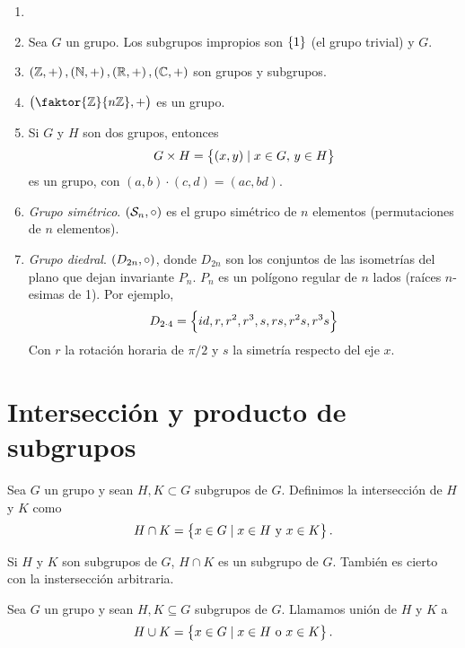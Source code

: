 \begin{example}
    \begin{enumerate}[1.]
        \item[]
        \item Sea $G$ un grupo. Los subgrupos impropios son $\left\{1\right\}$ (el grupo trivial) y $G$.
        \item $\left( \mathbb{Z}, + \right), \left( \mathbb{N}, + \right), \left( \mathbb{R}, + \right), \left( \mathbb{C}, + \right)$ son grupos y subgrupos.
        \item $\lp \faktor{\z}{n\z}, + \rp$ es un grupo.
        \item Si $G$ y $H$ son dos grupos, entonces
            \[
                 G \times H = \left\{(x,y) \mid x \in G, \, y \in H\right\}   
            \]
            es un grupo, con $(a, b) \cdot (c, d) = (ac, bd)$.
        \item \emph{Grupo simétrico}. $\left( \mathcal{S}_n, \circ \right)$ es el grupo simétrico de $n$ elementos (permutaciones de $n$ elementos).
        \item \emph{Grupo diedral}. $\left( D_{2n}, \circ \right)$, donde $D_{2n}$ son los conjuntos de las isometrías del plano que dejan invariante $P_n$.
            $P_n$ es un polígono regular de $n$ lados (raíces $n$-esimas de 1). Por ejemplo,
            \[
                D_{2 \cdot 4} = \left\{id, r, r^2, r^3, s, rs, r^2s, r^3s\right\}
            \]
            Con $r$ la rotación horaria de $\pi / 2$ y $s$ la simetría respecto del eje $x$.
    \end{enumerate}
\end{example}

\section{Intersección y producto de subgrupos}

\begin{defi}
    Sea $G$ un grupo y sean $H, K \subset G$ subgrupos de $G$. Definimos la intersección de
    $H$ y $K$ como
    \[
        H \cap K = \left\{x \in G \mid x \in H \text{ y } x \in K\right\}.
    \]
\end{defi}

\begin{obs}
    Si $H$ y $K$ son subgrupos de $G$, $H \cap K$ es un subgrupo de $G$.
    También es cierto con la instersección arbitraria.
\end{obs}

\begin{defi}
    Sea $G$ un grupo y sean $H, K \subseteq G$ subgrupos de $G$. Llamamos unión de $H$ y $K$ a
    \[
        H \cup K = \left\{x \in G \mid x \in H \text{ o } x \in K\right\}.
    \]
\end{defi}

